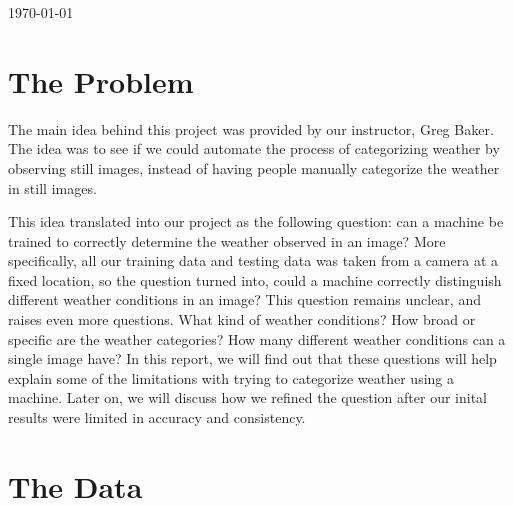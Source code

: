 \begin{titlepage}

{\large \today}\\[2cm] %


 

\vfill %

\end{titlepage}

\section{The Problem}

The main idea behind this project was provided by our instructor, Greg Baker. The idea was to see if we could automate the process of categorizing weather by observing still images, instead of having people manually categorize the weather in still images.

This idea translated into our project as the following question: can a machine be trained to correctly determine the weather observed in an image? More specifically, all our training data and testing data was taken from a camera at a fixed location, so the question turned into, could a machine correctly distinguish different weather conditions in an image? This question remains unclear, and raises even more questions. What kind of weather conditions? How broad or specific are the weather categories? How many different weather conditions can a single image have? In this report, we will find out that these questions will help explain some of the limitations with trying to categorize weather using a machine. Later on, we will discuss how we refined the question after our inital results were limited in accuracy and consistency. 

\section{The Data}

